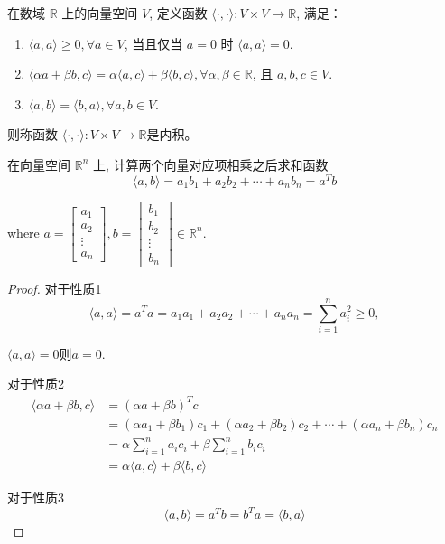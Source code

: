 \begin{definition}[内积]
    在数域 \( \mathbb{R} \) 上的向量空间 \( V \), 定义函数 \( \langle\cdot,\cdot\rangle:V \times V \rightarrow \mathbb{R} \), 满足：

    \begin{enumerate}
        \item $ \langle{a}, {a}\rangle \geq 0, \forall {a} \in V $, 当且仅当 $a=0$ 时 $ \langle a, a\rangle=0 $.
        \item \( \langle\alpha {a}+\beta {b}, c\rangle=\alpha\langle{a}, c\rangle+\beta\langle{b}, c\rangle, \forall \alpha, \beta \in \mathbb{R} \), 且 \( {a}, {b}, c \in V \).
        \item \( \langle{a}, {b}\rangle=\langle{b}, {a}\rangle, \forall {a}, {b} \in V \).
    \end{enumerate}

    则称函数 \( \langle\cdot,\cdot\rangle:V \times V \rightarrow \mathbb{R} \)是内积。 
\end{definition}

\begin{example}
    在向量空间 \( \mathbb{R}^{n} \) 上,  计算两个向量对应项相乘之后求和函数
    $$ \langle a, b\rangle=a_{1} b_{1}+a_{2} b_{2}+\cdots+a_{n} b_{n}=a^{T}{b} $$

where \( a=\left[\begin{array}{c}a_{1} \\ a_{2} \\ \vdots \\ a_{n}\end{array}\right], b=\left[\begin{array}{c}b_{1} \\ b_{2} \\ \vdots \\ b_{n}\end{array}\right] \in \mathbb{R}^{n} \).
\end{example}

\begin{proof}
对于性质1
    $$\langle a, a\rangle=a^T a=a_{1} a_{1}+a_{2} a_{2}+\cdots+a_{n} a_{n}=\sum_{i=1}^{n} a_{i}^{2} \geq 0,$$

    $\langle a, a\rangle=0 则 a=0$.

    对于性质2
    $$\begin{aligned} \langle\alpha a+\beta {b}, {c}\rangle 
    & = (\alpha a+\beta {b})^T c 
    \\ &=\left(\alpha a_{1}+\beta b_{1}\right) c_{1}+\left(\alpha a_{2}+\beta b_{2}\right) c_{2}+\cdots+\left(\alpha a_{n}+\beta b_{n}\right) c_{n} 
    \\ &=\alpha \sum_{i=1}^{n} a_{i} c_{i}+\beta \sum_{i=1}^{n} b_{i} c_{i}
    \\ &=\alpha\langle a, c\rangle+\beta\langle b, c\rangle\end{aligned} $$

    对于性质3
    $$ \langle a, b\rangle=a^{{T}} b=b^{{T}} a=\langle b, a\rangle $$
\end{proof}

